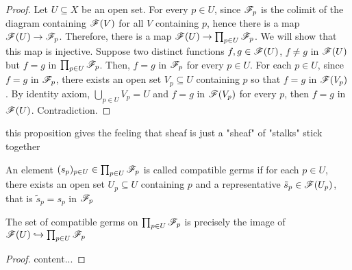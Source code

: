 \begin{proof}
	Let $U \subseteq X$ be an open set. For every $p \in U$, since $\mathscr{F}_p$ is the colimit of the diagram containing $\mathscr{F}(V)$ for all $V$ containing $p$, hence there is a map $\mathscr{F}(U) \to \mathscr{F}_p$. Therefore, there is a map $\mathscr{F}(U) \to \prod_{p \in U} \mathscr{F}_p$. We will show that this map is injective. Suppose two distinct functions $f, g \in \mathscr{F}(U)$, $f \neq g$ in $\mathscr{F}(U)$ but $f = g$ in $\prod_{p \in U} \mathscr{F}_p$. Then, $f = g$ in $\mathscr{F}_p$ for every $p \in U$. For each $p \in U$, since $f = g$ in $\mathscr{F}_p$, there exists an open set $V_p \subseteq U$ containing $p$ so that $f = g$ in $\mathscr{F}(V_p)$. By identity axiom, $\bigcup_{p \in U} V_p = U$ and $f = g$ in $\mathscr{F}(V_p)$ for every $p$, then $f = g$ in $\mathscr{F}(U)$. Contradiction.
\end{proof}

\begin{remark}
	this proposition gives the feeling that sheaf is just a "sheaf" of "stalks" stick together
\end{remark}

\begin{definition}
	An element $(s_p)_{p \in U} \in \prod_{p \in U} \mathscr{F}_p$ is called compatible germs if for each $p \in U$, there exists an open set $U_p \subseteq U$ containing $p$ and a representative $\tilde{s}_p \in \mathscr{F}(U_p)$, that is $\tilde{s}_p = s_p$ in $\mathscr{F}_p$
\end{definition}

\begin{proposition}
	The set of compatible germs on $\prod_{p \in U} \mathscr{F}_p$ is precisely the image of $\mathscr{F}(U) \hookrightarrow \prod_{p \in U} \mathscr{F}_p$
\end{proposition}

\begin{proof}
	content...
\end{proof}